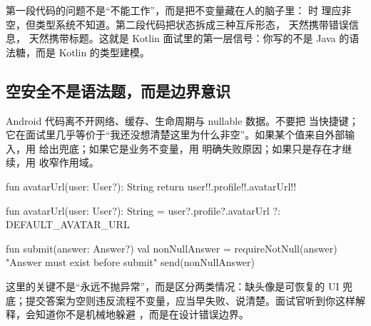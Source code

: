 

第一段代码的问题不是“不能工作”，而是把不变量藏在人的脑子里： 时  理应非空，但类型系统不知道。第二段代码把状态拆成三种互斥形态， 天然携带错误信息， 天然携带标题。这就是 Kotlin 面试里的第一层信号：你写的不是 Java 的语法糖，而是 Kotlin 的类型建模。

\subsection*{空安全不是语法题，而是边界意识}

Android 代码离不开网络、缓存、生命周期与 nullable 数据。不要把 \code{!!} 当快捷键；它在面试里几乎等价于“我还没想清楚这里为什么非空”。如果某个值来自外部输入，用  给出兜底；如果它是业务不变量，用  明确失败原因；如果只是存在才继续，用  收窄作用域。

\begin{ktbug}
fun avatarUrl(user: User?): String {
    return user!!.profile!!.avatarUrl!!
}
\end{ktbug}

\begin{ktfix}
fun avatarUrl(user: User?): String =
    user?.profile?.avatarUrl ?: DEFAULT_AVATAR_URL

fun submit(answer: Answer?) {
    val nonNullAnswer = requireNotNull(answer) { "Answer must exist before submit" }
    send(nonNullAnswer)
}
\end{ktfix}

这里的关键不是“永远不抛异常”，而是区分两类情况：缺头像是可恢复的 UI 兜底；提交答案为空则违反流程不变量，应当早失败、说清楚。面试官听到你这样解释，会知道你不是机械地躲避 \code{!!}，而是在设计错误边界。

